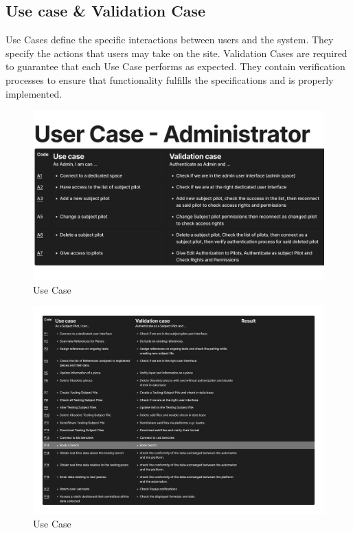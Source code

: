 \subsection{Use case {\&} Validation Case}
Use Cases define the specific interactions between users and the system. They specify the actions that users may take on the site.
Validation Cases are required to guarantee that each Use Case performs as expected. They contain verification processes to ensure that functionality fulfills the specifications and is properly implemented.
\begin{figure}[H]
    \centering
    \includegraphics[width=1.1\textwidth]{chapters/2/img/use case.png}
    \caption{Use Case}
    \label{fig:campus}
\end{figure}
\begin{figure}[H]
    \centering
    \includegraphics[width=1.\textwidth]{chapters/2/img/1.png}
    \caption{Use Case}
    \label{fig:campus}
\end{figure}

